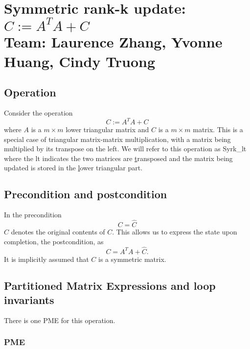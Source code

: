 \chapter{Symmetric rank-k update: $ C := A^TA + C $ \\
	\large Team: Laurence Zhang, Yvonne Huang, Cindy Truong } 



\section{Operation}

Consider the operation
\[
C := A^TA +C 
\]
where $ A $ is a $ m \times m $ lower triangular matrix and $ C $ is a $ m \times m $ matrix.
This is a special case of triangular 
matrix-matrix multiplication, 
with a matrix 
being multiplied by its transpose on the left.
We will refer to this operation
as {\sc Syrk\_lt} where the {\sc lt} indicates the two matrices are
\underline{t}ransposed and the matrix being updated is stored in the 
\underline{l}ower triangular part.


\section{Precondition and postcondition}

In the precondition 
\[
C = \widehat C
\]
$ \widehat C $ denotes the original contents of $ C $.
This allows us to express the state upon completion, the postcondition, as
\[
C = A^TA + \widehat C.
\]
It is implicitly assumed that $ C $ is a symmetric matrix.
\section{Partitioned Matrix Expressions and loop invariants}

There is one PME for this operation.

\subsection{PME}


